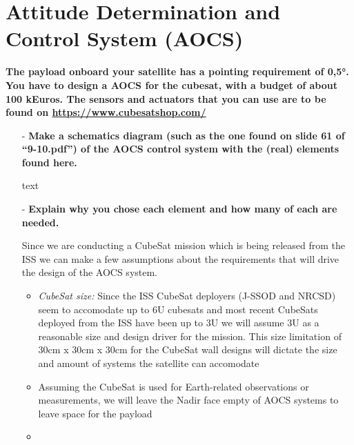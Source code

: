 \section{Attitude Determination and Control System (AOCS)}

\textbf{The payload onboard your satellite has a pointing requirement of 0,5°. You have to design a AOCS for the cubesat, with a budget of about 100 kEuros. The sensors and actuators that you can use are to be found on \url{https://www.cubesatshop.com/}}

\begin{itemize}
    \item[-] \textbf{Make a schematics diagram (such as the one found on slide 61 of “9-10.pdf”) of the AOCS control system with the (real) elements found here. } 

    text

    \item[-] \textbf{Explain why you chose each element and how many of each are needed. }

    Since we are conducting a CubeSat mission which is being released from the ISS we can make a few assumptions about the requirements that will drive the design of the AOCS system.
    \begin{itemize}
        \item \textit{CubeSat size:} Since the ISS CubeSat deployers (J-SSOD and NRCSD) seem to accomodate up to 6U \cite{deployers_wiki} cubesats and most recent CubeSats deployed from the ISS have been up to 3U we will assume 3U as a reasonable size and design driver for the mission.
        This size limitation of 30cm x 30cm x 30cm for the CubeSat wall designs will dictate the size and amount of systems the satellite can accomodate

        \item Assuming the CubeSat is used for Earth-related observations or measurements, we will leave the Nadir face empty of AOCS systems to leave space for the payload

        \item 
    \end{itemize}
    
\end{itemize}

